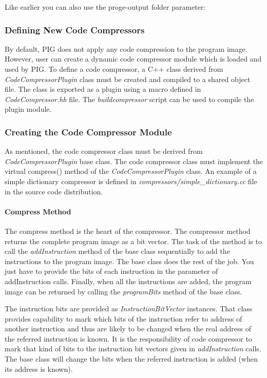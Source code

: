 \documentclass[a4paper,twoside]{tceusermanual}
\begin{document}

Like earlier you can also use the proge-output folder parameter:


\subsubsection{Defining New Code Compressors}

By default, PIG does not apply any code compression to the program
image. However, user can create a dynamic code compressor module which
is loaded and used by PIG. To define a code compressor, a C++ class
derived from \emph{CodeCompressorPlugin} class must be created and
compiled to a shared object file. The class is exported as a plugin
using a macro defined in \emph{CodeCompressor.hh} file. The 
\emph{buildcompressor} script can be used to compile the plugin
module.

\subsubsection{Creating the Code Compressor Module}

As mentioned, the code compressor class must be derived from
\emph{CodeCompressorPlugin} base class. The code compressor class
must implement the virtual compress() method of the
\emph{CodeCompressorPlugin} class. An example of a simple dictionary
compressor is defined in \emph{compressors/simple\_dictionary.cc} file in the source code distribution.

\paragraph{Compress Method}

The compress method is the heart of the compressor. The compressor
method returns the complete program image as a bit vector. The task of
the method is to call the \emph{addInstruction} method of the base class
sequentially to add the instructions to the program image. The base
class does the rest of the job. You just have to provide the bits of
each instruction in the parameter of addInstruction calls. Finally,
when all the instructions are added, the program image can be returned
by calling the \emph{programBits} method of the base class.

The instruction bits are provided as \emph{InstructionBitVector}
instances. That class provides capability to mark which bits of the
instruction refer to address of another instruction and thus are
likely to be changed when the real address of the referred instruction
is known. It is the responsibility of code compressor to mark that
kind of bits to the instruction bit vectors given in \emph{addInstruction}
calls. The base class will change the bits when the referred
instruction is added (when its address is known).
\end{document}
